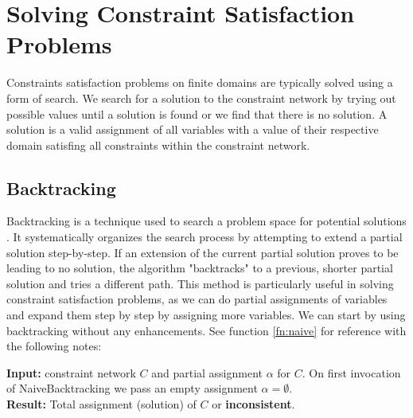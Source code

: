 \chapter{Solving Constraint Satisfaction Problems} \label{chap:solveCSP}

Constraints satisfaction problems on finite domains are typically solved using a form of search. We search for a solution to the constraint network by trying out possible values until a solution is found or we find that there is no solution. A solution is a valid assignment of all variables with a value of their respective domain satisfing all constraints within the constraint network.

\section{Backtracking}

Backtracking is a technique used to search a problem space for potential solutions \cite{backtracking:1975}. It systematically organizes the search process by attempting to extend a partial solution step-by-step. If an extension of the current partial solution proves to be leading to no solution, the algorithm "backtracks" to a previous, shorter partial solution and tries a different path. This method is particularly useful in solving constraint satisfaction problems, as we can do partial assignments of variables and expand them step by step by assigning more variables. We can start by using backtracking without any enhancements. See function \ref{fn:naive} for reference with the following notes:

\textbf{Input:} constraint network $C$ and partial assignment $\alpha$ for $C$. On first invocation of NaiveBacktracking we pass an empty assignment $\alpha = \emptyset$. \\
\textbf{Result:} Total assignment (solution) of $C$ or \textbf{inconsistent}.\\

